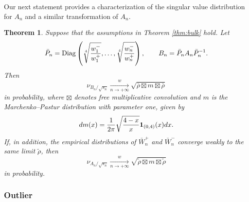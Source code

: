 \documentclass[11pt,oneside]{amsart}
\theoremstyle{plain}
\newtheorem{theorem}{Theorem}[section]
\numberwithin{equation}{section}
\newcommand{\one}{\textup{\textbf{1}}}
\newcommand{\wconv}{\xrightarrow[\textit{n} \to +\infty]{\quad {w} \quad}}
\newcommand{\scaling}{s_n}
\begin{document}
Our next statement provides a characterization of the singular value distribution for $A_n$ and a similar transformation of $A_n$.
\begin{theorem} \label{thm:SV}
Suppose that the assumptions in Theorem \ref{thm:bulk} hold. Let
\begin{equation}
\label{eq:B}
\bar P_n =
{\rm Diag}\left(
\sqrt[4]{\frac{w_1^-}{w_1^+}},\dots,
\sqrt[4]{\frac{w_n^-}{w_n^+}}
\right),
\qquad
B_n=\bar P_n A_n\bar P_n^{-1}.
\end{equation}
Then
\begin{equation}
\nu_{B_n/\sqrt{\scaling}}
\wconv
\sqrt{\bar\rho\boxtimes m\boxtimes\bar\rho}
\end{equation}
in probability, where $\boxtimes$ denotes free multiplicative convolution and $m$ is the Marchenko--Pastur distribution with parameter one, given by
\begin{equation} \label{eq:marchenko-1}
    dm(x)=\frac1{2\pi} \sqrt\frac{{4-x}}{x} \one_{(0,4)}(x)dx.
\end{equation}
If, in addition, the empirical distributions of $\bar W_n^+$ and $\bar W_n^-$ converge weakly to the same limit $\tilde\rho$, then
\begin{equation}
\nu_{A_n/\sqrt{\scaling}}
\wconv
\sqrt{\tilde\rho\boxtimes m\boxtimes\tilde\rho}
\end{equation}
in probability.
\end{theorem}

\subsubsection{Outlier}
\end{document}
